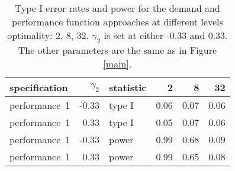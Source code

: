 \begin{table}[ht]
\centering
\begingroup\footnotesize
\begin{tabular}{lrlrrr}
  \hline
specification & $\gamma_2$ & statistic & 2 & 8 & 32 \\ 
  \hline
performance~1 & -0.33 & type I & 0.06 & 0.07 & 0.06 \\ 
  performance~1 & 0.33 & type I & 0.05 & 0.07 & 0.06 \\ 
  performance~1 & -0.33 & power & 0.99 & 0.68 & 0.09 \\ 
  performance~1 & 0.33 & power & 0.99 & 0.65 & 0.08 \\ 
   \hline
\end{tabular}
\endgroup
\caption{Type I error rates and power for the demand and 
  performance function approaches at different levels optimality: 
  2, 8, 32. $\gamma_2$ is set at either -0.33 and 0.33. The other 
  parameters are the same as in Figure \ref{main}.} 
\label{bootstrap-table}
\end{table}
